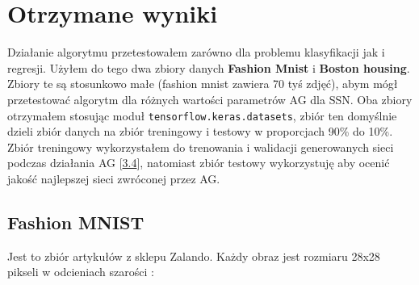 \documentclass{article}
\begin{document}
\section{Otrzymane wyniki}
Działanie algorytmu przetestowałem zarówno dla problemu klasyfikacji jak i regresji.
Użyłem do tego dwa zbiory danych \textbf{Fashion Mnist} i \textbf{Boston housing}. 
Zbiory te są stosunkowo małe (fashion mnist zawiera 70 tyś zdjęć), abym mógł przetestować 
algorytm dla różnych wartości parametrów AG dla SSN. Oba zbiory otrzymałem 
stosując moduł \texttt{tensorflow.keras.datasets}, zbiór ten domyślnie dzieli zbiór
danych na zbiór treningowy i testowy w proporcjach 90\% do 10\%. Zbiór treningowy wykorzystałem
do trenowania i walidacji generowanych  sieci podczas działania AG [\hyperref[sec:ocena]{3.4}],
natomiast zbiór testowy wykorzystuję aby ocenić jakość najlepszej sieci zwróconej
przez AG.
\subsection{Fashion MNIST}
Jest to zbiór artykułów z sklepu Zalando. Każdy obraz jest rozmiaru 28x28 pikseli w odcieniach 
szarości \cite{fm}:
\end{document}
